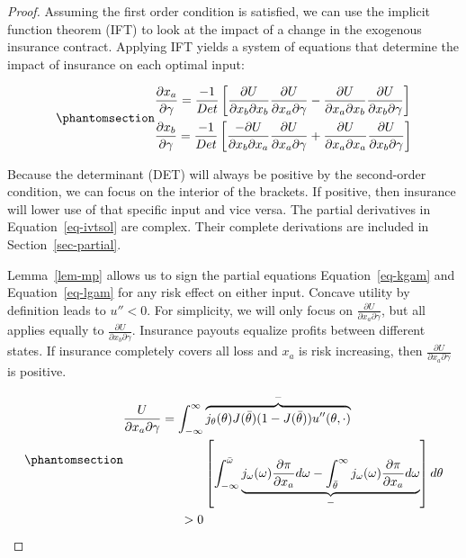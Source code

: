 \documentclass[
  letterpaper,
  DIV=11,
  numbers=noendperiod]{scrartcl}
\theoremstyle{plain}
\theoremstyle{plain}
\theoremstyle{remark}
\begin{document}
\begin{proof}
Assuming the first order condition is satisfied, we can use the implicit
function theorem (IFT) to look at the impact of a change in the
exogenous insurance contract. Applying IFT yields a system of equations
that determine the impact of insurance on each optimal input:

\begin{equation}\phantomsection\label{eq-ivtsol}{
\begin{aligned}
&\frac{\partial x_a}{\partial \gamma}=\frac{-1}{Det}\left[\frac{\partial U}{\partial x_b \partial x_b}\frac{\partial U}{\partial x_a \partial \gamma}-\frac{\partial U}{\partial x_a \partial x_b}\frac{\partial U}{\partial x_b \partial \gamma}\right] \\
&\frac{\partial x_b}{\partial \gamma}=\frac{-1}{Det}\left[\frac{-\partial U}{\partial x_b \partial x_a}\frac{\partial U}{\partial x_a \partial \gamma}+\frac{\partial U}{\partial x_a \partial x_a}\frac{\partial U}{\partial x_b \partial \gamma}\right]
\end{aligned}
}\end{equation}

Because the determinant (DET) will always be positive by the
second-order condition, we can focus on the interior of the brackets. If
positive, then insurance will lower use of that specific input and vice
versa. The partial derivatives in Equation~\ref{eq-ivtsol} are complex.
Their complete derivations are included in Section~\ref{sec-partial}.

Lemma~\ref{lem-mp} allows us to sign the partial equations
Equation~\ref{eq-kgam} and Equation~\ref{eq-lgam} for any risk effect on
either input. Concave utility by definition leads to \(u''<0\). For
simplicity, we will only focus on
\(\frac{\partial U}{\partial x_a\partial \gamma}\), but all applies
equally to \(\frac{\partial U}{\partial x_b\partial \gamma}\). Insurance
payouts equalize profits between different states. If insurance
completely covers all loss and \(x_a\) is risk increasing, then
\(\frac{\partial U}{\partial x_a\partial \gamma}\) is positive.

\begin{equation}\phantomsection\label{eq-kgamsol}{
\begin{aligned}
\frac{U}{\partial x_a \partial \gamma}=\int^{\infty}_{-\infty}&\overbrace{j_{\theta}(\theta)J(\bar\theta)(1-J(\bar\theta))u''(\theta,\cdot)}^{-}\\
&\left[ \int^{\bar\omega}_{-\infty}\underbrace{j_{\omega}(\omega)\frac{\partial \pi}{\partial x_a}d\omega
-\int^{\infty}_{\bar{\theta}}j_{\omega}(\omega)\frac{\partial \pi}{\partial x_a}d\omega}_{-}\right] d\theta\\
>0
\end{aligned}
}\end{equation}


\end{proof}
\end{document}
